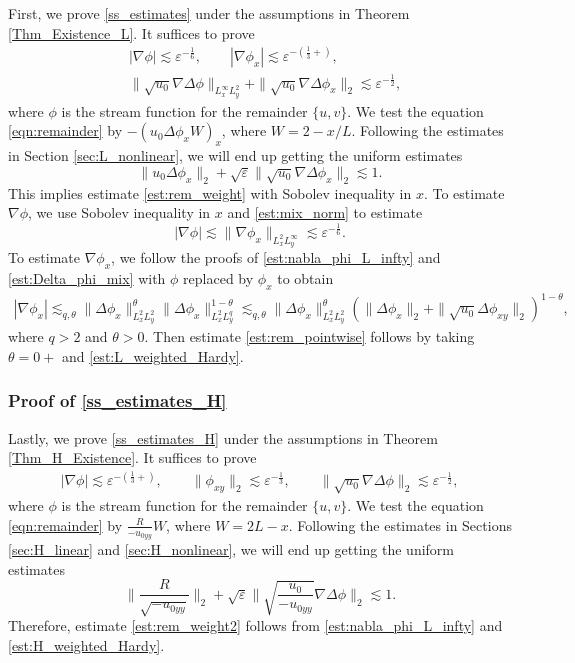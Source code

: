 \documentclass[reqno, 11pt]{amsart}
\theoremstyle{plain}
\theoremstyle{definition}
\theoremstyle{remark}
\numberwithin{equation}{section}
\begin{document}
First, we prove \eqref{ss_estimates} under the assumptions in Theorem \ref{Thm_Existence_L}. It suffices to prove
\begin{align}
&|\nabla \phi| \lesssim \varepsilon^{-\frac{1}{6}}, \qquad |\nabla \phi_x| \lesssim \varepsilon^{-(\frac{1}{3}+)}, \label{est:rem_pointwise}\\
&\| \sqrt{u_0} \nabla \Delta \phi \|_{L^\infty_x L^2_y} + \| \sqrt{u_0} \nabla \Delta \phi_x \|_{2} \lesssim \varepsilon^{-\frac{1}{2}}, \label{est:rem_weight}
\end{align}
where $\phi$ is the stream function for the remainder $\{u,v\}$.
We test the equation \eqref{eqn:remainder} by $-(u_0 \Delta \phi_x W)_x$, where $W = 2 - x/L$. Following the estimates in Section \ref{sec:L_nonlinear}, we will end up getting the uniform estimates
$$
\| u_0 \Delta \phi_x\|_2 + \sqrt{\varepsilon} \| \sqrt{u_0} \nabla\Delta \phi_x\|_2 \lesssim 1.
$$
This implies estimate \eqref{est:rem_weight} with Sobolev inequality in $x$. To estimate $\nabla \phi$, we use Sobolev inequality in $x$ and \eqref{est:mix_norm} to estimate
$$
|\nabla \phi| \lesssim \| \nabla \phi_x\|_{L^2_x L^\infty_y} \lesssim \varepsilon^{-\frac{1}{6}}.
$$
To estimate $\nabla \phi_x$, we follow the proofs of \eqref{est:nabla_phi_L_infty} and \eqref{est:Delta_phi_mix} with $\phi$ replaced by $\phi_x$ to obtain
\begin{align*}
|\nabla \phi_x| \lesssim_{q,\theta} \|\Delta \phi_x\|_{L^2_xL^2_y}^\theta \|\Delta \phi_x\|_{L^2_xL^q_y}^{1-\theta} \lesssim_{q,\theta} \|\Delta \phi_x\|_{L^2_xL^2_y}^\theta (\| \Delta \phi_x\|_2 + \| \sqrt{u_0} \Delta\phi_{xy}\|_2)^{1-\theta},
\end{align*}
where $q > 2$ and $\theta > 0$. Then estimate \eqref{est:rem_pointwise} follows by taking $\theta = 0+$ and \eqref{est:L_weighted_Hardy}.


\subsubsection{Proof of \eqref{ss_estimates_H}} Lastly, we prove \eqref{ss_estimates_H} under the assumptions in Theorem \ref{Thm_H_Existence}. It suffices to prove
\begin{align}
|\nabla \phi| \lesssim \varepsilon^{-(\frac{1}{3}+)}, \qquad \| \phi_{xy}\|_2 \lesssim \varepsilon^{-\frac{1}{3}},\qquad \| \sqrt{u_0} \nabla \Delta \phi \|_{2} \lesssim \varepsilon^{-\frac{1}{2}}, \label{est:rem_weight2}
\end{align}
where $\phi$ is the stream function for the remainder $\{u,v\}$. We test the equation \eqref{eqn:remainder} by $\frac{R}{-u_{0yy}}W$, where $W = 2L - x$. Following the estimates in Sections \ref{sec:H_linear} and \ref{sec:H_nonlinear}, we will end up getting the uniform estimates
$$
 \|\frac{R}{\sqrt{-u_{0yy}}}\|_{2} + \sqrt\varepsilon  \| \sqrt{\frac{u_0}{-u_{0yy}}} \nabla \Delta \phi \|_{2} \lesssim 1.
$$
Therefore, estimate \eqref{est:rem_weight2} follows from \eqref{est:nabla_phi_L_infty} and \eqref{est:H_weighted_Hardy}.
\end{document}
